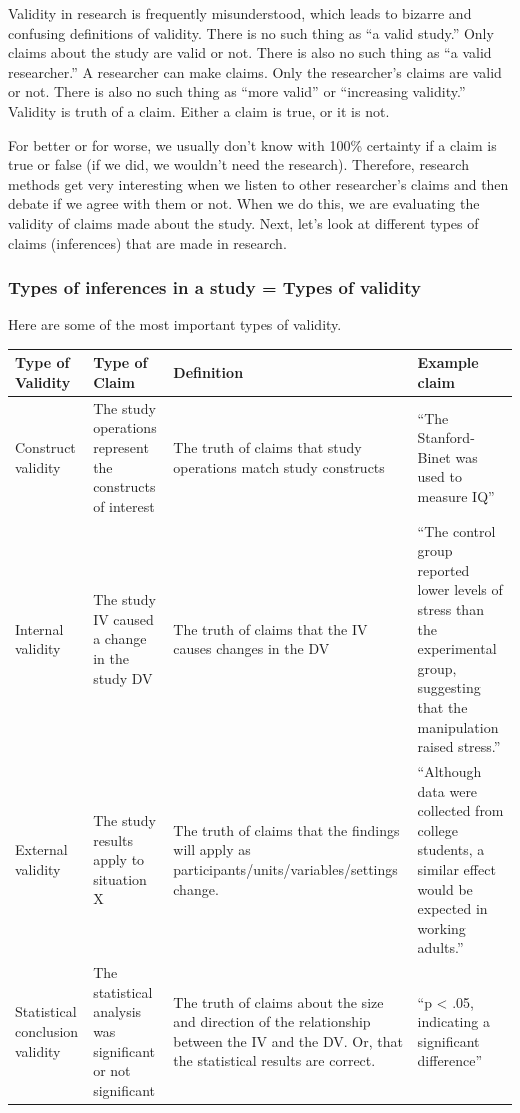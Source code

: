 \documentclass[
]{book}
\begin{document}
Validity in research is frequently misunderstood, which leads to bizarre and confusing definitions of validity. There is no such thing as ``a valid study.'' Only claims about the study are valid or not. There is also no such thing as ``a valid researcher.'' A researcher can make claims. Only the researcher's claims are valid or not. There is also no such thing as ``more valid'' or ``increasing validity.'' Validity is truth of a claim. Either a claim is true, or it is not.

For better or for worse, we usually don't know with 100\% certainty if a claim is true or false (if we did, we wouldn't need the research). Therefore, research methods get very interesting when we listen to other researcher's claims and then debate if we agree with them or not. When we do this, we are evaluating the validity of claims made about the study. Next, let's look at different types of claims (inferences) that are made in research.

\hypertarget{types-of-inferences-in-a-study-types-of-validity}{%
\subsubsection{Types of inferences in a study = Types of validity}\label{types-of-inferences-in-a-study-types-of-validity}}

Here are some of the most important types of validity.

\begin{longtable}[]{@{}
  >{\raggedright\arraybackslash}p{}
  >{\raggedright\arraybackslash}p{}
  >{\raggedright\arraybackslash}p{}
  >{\raggedright\arraybackslash}p{}@{}}
\toprule
Type of Validity & Type of Claim & Definition & Example claim \\
\midrule
\endhead
Construct validity & The study operations represent the constructs of interest & The truth of claims that study operations match study constructs & ``The Stanford-Binet was used to measure IQ'' \\
Internal validity & The study IV caused a change in the study DV & The truth of claims that the IV causes changes in the DV & ``The control group reported lower levels of stress than the experimental group, suggesting that the manipulation raised stress.'' \\
External validity & The study results apply to situation X & The truth of claims that the findings will apply as participants/units/variables/settings change. & ``Although data were collected from college students, a similar effect would be expected in working adults.'' \\
Statistical conclusion validity & The statistical analysis was significant or not significant & The truth of claims about the size and direction of the relationship between the IV and the DV. Or, that the statistical results are correct. & ``p \textless{} .05, indicating a significant difference'' \\
\bottomrule
\end{longtable}
\end{document}
